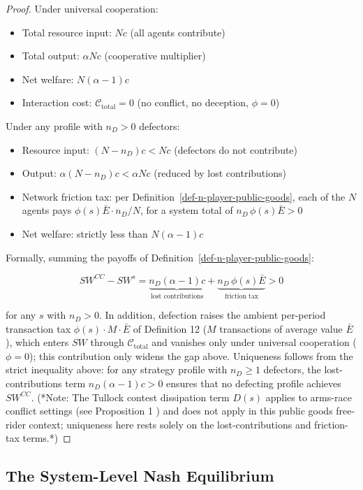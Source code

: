 \documentclass[11pt]{article}
\theoremstyle{plain}
\theoremstyle{definition}
\theoremstyle{remark}
\let\origsubsection\subsection
\renewcommand{\subsection}{\needspace{7\baselineskip}\origsubsection}
\begin{document}
\begin{proof}
Under universal cooperation:
\begin{itemize}
\item Total resource input: $Nc$ (all agents contribute)
\item Total output: $\alpha N c$ (cooperative multiplier)
\item Net welfare: $N(\alpha - 1)c$
\item Interaction cost: $\mathcal{C}_{\text{total}} = 0$ (no conflict, no deception, $\phi = 0$)
\end{itemize}
Under any profile with $n_D > 0$ defectors:
\begin{itemize}
\item Resource input: $(N - n_D)c < Nc$ (defectors do not contribute)
\item Output: $\alpha(N - n_D)c < \alpha Nc$ (reduced by lost contributions)
\item Network friction tax: per Definition~\ref{def-n-player-public-goods}, each of the $N$ agents pays $\phi(s) \bar{E} \cdot n_D / N$, for a system total of $n_D \, \phi(s) \bar{E} > 0$
\item Net welfare: strictly less than $N(\alpha - 1)c$
\end{itemize}
Formally, summing the payoffs of Definition~\ref{def-n-player-public-goods}:

$$SW^{CC} - SW^{s} = \underbrace{n_D (\alpha - 1)c}_{\text{lost contributions}} + \underbrace{n_D \, \phi(s) \bar{E}}_{\text{friction tax}} > 0$$

for any $s$ with $n_D > 0$. In addition, defection raises the ambient per-period transaction tax $\phi(s) \cdot M \cdot \bar{E}$ of Definition 12 \citep{TC-IV} ($M$ transactions of average value $\bar{E}$), which enters $SW$ through $\mathcal{C}_{\text{total}}$ and vanishes only under universal cooperation ($\phi = 0$); this contribution only widens the gap above. Uniqueness follows from the strict inequality above: for any strategy profile with $n_D \geq 1$ defectors, the lost-contributions term $n_D(\alpha - 1)c > 0$ ensures that no defecting profile achieves $SW^{CC}$. (*Note: The Tullock contest dissipation term $D(s)$ applies to arms-race conflict settings (see Proposition 1 \citep{TC-IV}) and does not apply in this public goods free-rider context; uniqueness here rests solely on the lost-contributions and friction-tax terms.*)
\end{proof}

\subsection{The System-Level Nash
Equilibrium}\label{the-system-level-nash-equilibrium}
\end{document}
